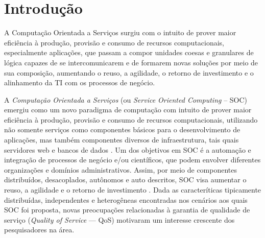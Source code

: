 
\section{Introdu\c{c}\~{a}o}\label{sec:introduction}

A Computação Orientada a Serviços surgiu com o intuito de prover maior eficiência à produção, provisão e consumo de recursos computacionais, especialmente aplicações, que passam a compor unidades coesas e granulares de lógica capazes de se intercomunicarem e de formarem novas soluções por meio de sua composição, aumentando o reuso, a agilidade, o retorno de investimento e o alinhamento da TI com os processos de negócio. 

A \emph{Computa\c c\~{a}o Orientada a Servi\c cos} (ou \emph{Service Oriented Computing} -- SOC) emergiu como um novo paradigma de computa\c c\~{a}o com intuito de prover maior eficiência à produção, provisão e consumo de recursos computacionais, utilizando não somente servi\c cos como componentes b\'{a}sicos para o desenvolvimento de aplica\c c\~{o}es, mas também componentes diversos de infraestrutura, tais quais servidores web e bancos de dados \cite{papazoglou:cacm2003} \cite{10.1109/MIC.2010.147}. Um dos objetivos em SOC \'{e} a automa\c c\~{a}o e integra\c c\~{a}o de processos de neg\'{o}cio e/ou cient\'{i}ficos, que podem envolver diferentes organiza\c c\~{o}es e domínios administrativos. Assim, por meio de componentes distribuídos, desacoplados, autônomos e auto descritos, SOC visa aumentar o reuso, a agilidade e o retorno de investimento \cite{Erl:2007:SPS:1296147}. Dada as caracter\'{i}ticas tipicamente distribu\'{i}das, independentes e heterog\^{e}neas encontradas nos cen\'{a}rios aos quais SOC foi proposta, novas preocupa\c c\~{o}es relacionadas \`{a} garantia de qualidade de servi\c co (\emph{Quality of Service} --- QoS) motivaram um interesse crescente dos pesquisadores na \'{a}rea. 






